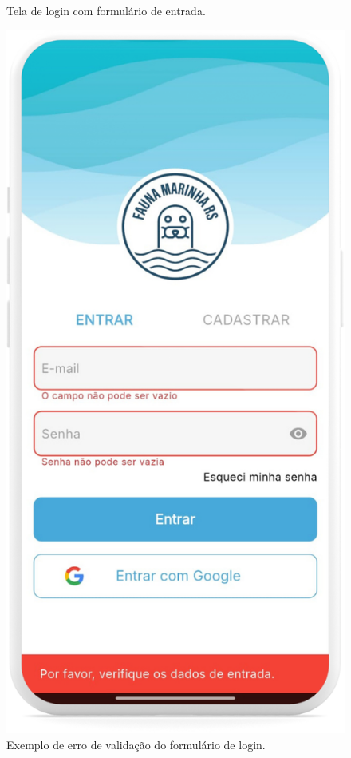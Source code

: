 \begin{figure}[H]
\begin{minipage}[t]{0.48\textwidth}
        \caption{Tela de login com formulário de entrada.}
        \label{fig:login}
    \end{minipage}
    \hfill
    \begin{minipage}[t]{0.48\textwidth}
        \centering
        \includegraphics[height=0.72\textheight]{imagens/sistema/device_frame/formularioLogin_erro.png}
        \caption{Exemplo de erro de validação do formulário de login.}
        \label{fig:login-erro}
    \end{minipage}
\end{figure}

